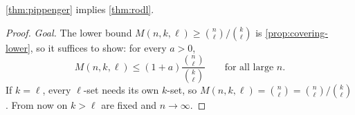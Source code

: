 \begin{observation}
    \autoref{thm:pippenger} implies \autoref{thm:rodl}.
\end{observation}

\begin{proof}
    \emph{Goal.} The lower bound \(M(n,k,\ell) \ge \binom{n}{\ell} \big/ \binom{k}{\ell}\) is \autoref{prop:covering-lower}, so it suffices to show: for every \(a > 0\),
    \begin{equation}\label{eq:rodl-upper}
        M(n,k,\ell) \le (1 + a) \frac{\binom{n}{\ell}}{\binom{k}{\ell}}
        \qquad\text{for all large } n .
    \end{equation}
    If \(k = \ell\), every \(\ell\)-set needs its own \(k\)-set, so \(M(n,k,\ell) = \binom{n}{\ell} = \binom{n}{\ell} \big/ \binom{k}{\ell}\). From now on \(k > \ell\) are fixed and \(n \to \infty\).


\end{proof}
